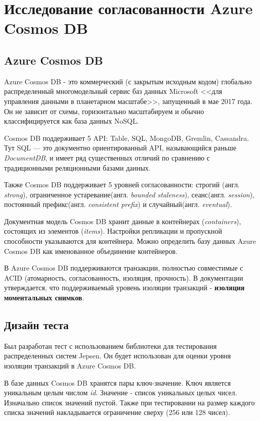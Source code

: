 \documentclass[12pt,  openany]{book}
\begin{document}
\chapter{Исследование согласованности Azure Cosmos DB}
\section{Azure Cosmos DB}
Azure Cosmos DB - это коммерческий (с закрытым исходным кодом) глобально распределенный многомодельный сервис баз данных Microsoft <<для управления данными в планетарном масштабе>>, запущенный в мае 2017 года. Он не зависит от схемы, горизонтально масштабируем и обычно классифицируется как база данных NoSQL.
\par Cosmos DB поддерживает 5 API: Table, SQL, MongoDB, Gremlin, Cassandra.  Тут SQL --- это документно ориентированный API, называющийся раньше \textit{DocumentDB}, и имеет ряд существенных отличий по сравнению с традиционными реляционными базами данных.
\par Также Cosmos DB поддерживает 5 уровней согласованности: строгий (англ.  \textit{strong}), ограниченное устаревание(англ.  \textit{bounded staleness}), сеанс(англ.  \textit{session}), постоянный префикс(англ.  \textit{consistent prefix}) и случайный(англ.  \textit{eventual}).
\par Документная модель Cosmos DB хранит данные в контейнерах (\textit{containers}), состоящих из элементов (\textit{items}). Настройки репликации и пропускной способности указываются для контейнера. Можно определить базу данных Azure Cosmos DB как именованное объединение контейнеров.
\par В Azure Cosmos DB поддерживаются транзакции, полностью совместимые с ACID (атомарность, согласованность, изоляция, прочность). В документации утверждается, что поддерживаемый уровень изоляции транзакций - \textbf{изоляция моментальных снимков}. 

\section{Дизайн теста}
Был разработан тест с использованием библиотеки для тестирования распределенных систем Jepsen. Он будет использован для оценки уровня изоляции транзакций в Azure Cosmos DB. 

В базе данных Cosmos DB хранятся пары ключ-значение. Ключ является уникальным целым числом \textit{id}. Значение - список уникальных целых чисел. Изначально список значений пустой. Также при тестировании на размер каждого списка значений накладывается ограничение сверху (256 или 128 чисел).
\end{document}
